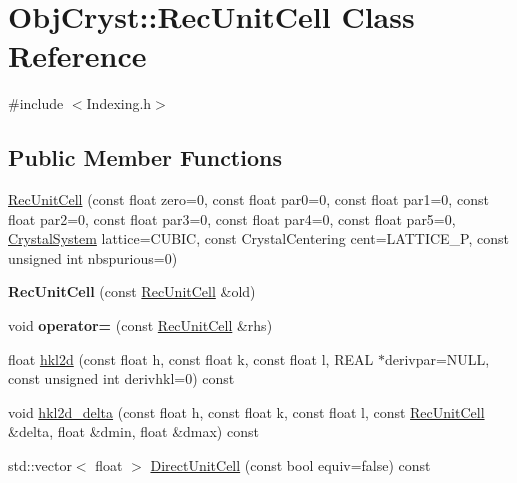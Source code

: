 \hypertarget{class_obj_cryst_1_1_rec_unit_cell}{}\section{Obj\+Cryst\+::Rec\+Unit\+Cell Class Reference}
\label{class_obj_cryst_1_1_rec_unit_cell}


{\ttfamily \#include $<$Indexing.\+h$>$}

\subsection*{Public Member Functions}
\begin{DoxyCompactItemize}
\item 
\mbox{\hyperlink{class_obj_cryst_1_1_rec_unit_cell_a8e5285531d4368e2972431a3a94b259a}{Rec\+Unit\+Cell}} (const float zero=0, const float par0=0, const float par1=0, const float par2=0, const float par3=0, const float par4=0, const float par5=0, \mbox{\hyperlink{namespace_obj_cryst_a9cd1d00f4ec9f0e75564ee151f47dd83}{Crystal\+System}} lattice=C\+U\+B\+IC, const Crystal\+Centering cent=L\+A\+T\+T\+I\+C\+E\+\_\+P, const unsigned int nbspurious=0)
\item 
\mbox{\label{class_obj_cryst_1_1_rec_unit_cell_aa9c6ed37f40ded76feb05ef9abc13eb6}} 
{\bfseries Rec\+Unit\+Cell} (const \mbox{\hyperlink{class_obj_cryst_1_1_rec_unit_cell}{Rec\+Unit\+Cell}} \&old)
\item 
\mbox{\label{class_obj_cryst_1_1_rec_unit_cell_a317806844b8bb03f4d5a940465e76975}} 
void {\bfseries operator=} (const \mbox{\hyperlink{class_obj_cryst_1_1_rec_unit_cell}{Rec\+Unit\+Cell}} \&rhs)
\item 
float \mbox{\hyperlink{class_obj_cryst_1_1_rec_unit_cell_a677f7a039a1018695f242a0e3868945b}{hkl2d}} (const float h, const float k, const float l, R\+E\+AL $\ast$derivpar=N\+U\+LL, const unsigned int derivhkl=0) const
\item 
void \mbox{\hyperlink{class_obj_cryst_1_1_rec_unit_cell_a04469a03019e95f911ca7f04604f7ff8}{hkl2d\+\_\+delta}} (const float h, const float k, const float l, const \mbox{\hyperlink{class_obj_cryst_1_1_rec_unit_cell}{Rec\+Unit\+Cell}} \&delta, float \&dmin, float \&dmax) const
\item 
std\+::vector$<$ float $>$ \mbox{\hyperlink{class_obj_cryst_1_1_rec_unit_cell_ad8ad14d3c38e1926ea7e14a995824535}{Direct\+Unit\+Cell}} (const bool equiv=false) const
\end{DoxyCompactItemize}
